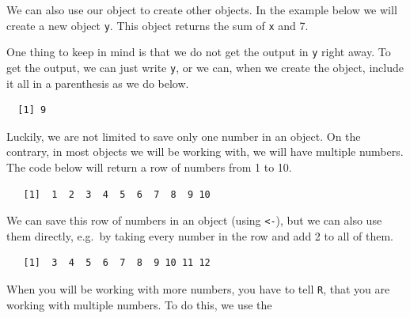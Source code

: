 \documentclass[12pt,oneside]{reedthesis}
\theoremstyle{definition}
\theoremstyle{definition}
\theoremstyle{definition}
\theoremstyle{remark}
\begin{document}
  We can also use our object to create other objects. In the example below
  we will create a new object \texttt{y}. This object returns the sum of
  \texttt{x} and 7.
  \begin{Shaded}
  \begin{Highlighting}[]
  \StringTok{ }\OperatorTok{+}\StringTok{ }
  \end{Highlighting}
  \end{Shaded}
  One thing to keep in mind is that we do not get the output in \texttt{y}
  right away. To get the output, we can just write \texttt{y}, or we can,
  when we create the object, include it all in a parenthesis as we do
  below.
  \begin{Shaded}
  \begin{Highlighting}[]
  \StringTok{ }\OperatorTok{+}\StringTok{ }\NormalTok{)}
  \end{Highlighting}
  \end{Shaded}
  \begin{verbatim}
  [1] 9
  \end{verbatim}
  Luckily, we are not limited to save only one number in an object. On the
  contrary, in most objects we will be working with, we will have multiple
  numbers. The code below will return a row of numbers from 1 to 10.
  \begin{Shaded}
  \begin{Highlighting}[]
  \OperatorTok{:}
  \end{Highlighting}
  \end{Shaded}
  \begin{verbatim}
   [1]  1  2  3  4  5  6  7  8  9 10
  \end{verbatim}
  We can save this row of numbers in an object (using
  \texttt{\textless{}-}), but we can also use them directly, e.g.~by
  taking every number in the row and add 2 to all of them.
  \begin{Shaded}
  \begin{Highlighting}[]
  \OperatorTok{:} \OperatorTok{+}\StringTok{ }
  \end{Highlighting}
  \end{Shaded}
  \begin{verbatim}
   [1]  3  4  5  6  7  8  9 10 11 12
  \end{verbatim}
  When you will be working with more numbers, you have to tell \texttt{R},
  that you are working with multiple numbers. To do this, we use the
\end{document}
